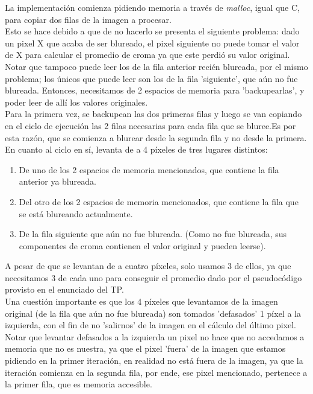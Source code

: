 La implementación comienza pidiendo memoria a través de \textit{malloc}, igual que C, para copiar dos filas de la imagen a procesar.\\
Esto se hace debido a que de no hacerlo se presenta el siguiente problema: dado un pixel X que acaba de ser blureado, el pixel siguiente no puede tomar el valor de X para calcular el promedio de croma ya que este perdió su valor original. Notar que tampoco puede leer los de la fila anterior recién blureada, por el mismo problema; los únicos que puede leer son los de la fila 'siguiente', que aún no fue blureada. Entonces, necesitamos de 2 espacios de memoria para 'backupearlas', y poder leer de allí los valores originales.\\

Para la primera vez, se backupean las dos primeras filas y luego se van copiando en el ciclo de ejecución las 2 filas necesarias para cada fila que se bluree.Es por esta razón, que se comienza a blurear desde la segunda fila y no desde la primera.\\

En cuanto al ciclo en sí, levanta de a 4 píxeles de tres lugares distintos:
\begin{enumerate}
\item De uno de los 2 espacios de memoria mencionados, que contiene la fila anterior ya blureada.
\item Del otro de los 2 espacios de memoria mencionados, que contiene la fila que se está blureando actualmente.
\item De la fila siguiente que aún no fue blureada. (Como no fue blureada, sus componentes de croma contienen el valor original y pueden leerse). \\
\end{enumerate}
A pesar de que se levantan de a cuatro píxeles, solo usamos 3 de ellos, ya que necesitamos 3 de cada uno para conseguir el promedio dado por el pseudocódigo provisto en el enunciado del TP.\\

Una cuestión importante es que los 4 píxeles que levantamos de la imagen original (de la fila que aún no fue blureada) son tomados 'defasados' 1 píxel a la izquierda, con el fin de no 'salirnos' de la imagen en el cálculo del último pixel. Notar que levantar defasados a la izquierda un pixel no hace que no accedamos a memoria que no es nuestra, ya que el pixel 'fuera' de la imagen que estamos pidiendo en la primer iteración, en realidad no está fuera de la imagen, ya que la iteración comienza en la segunda fila, por ende, ese pixel mencionado, pertenece a la primer fila, que es memoria accesible.

